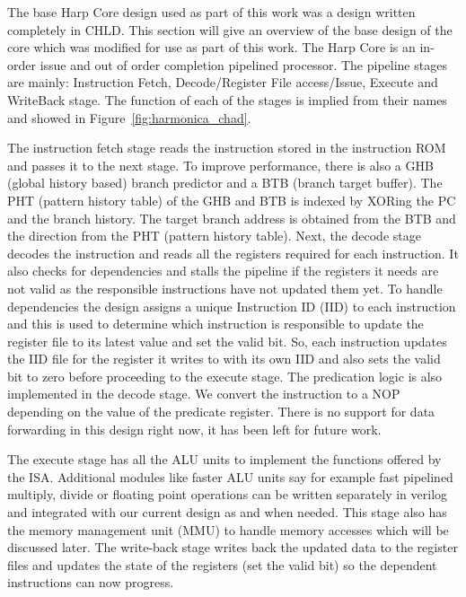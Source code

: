 The base Harp Core design used as part of this work was a design written completely in CHLD. This section will give an overview of the base design of the core which was modified for use as part of this work. The Harp Core is an in-order issue and out of order completion pipelined processor. The pipeline stages are mainly: Instruction Fetch, Decode/Register File access/Issue, Execute and WriteBack stage. The function of each of the stages is implied from their names and showed in Figure~\ref{fig:harmonica_chad}. 

The instruction fetch stage reads the instruction stored in the instruction ROM and passes it to the next stage. To improve performance, there is also a GHB (global history based) branch predictor and a BTB (branch target buffer). The PHT (pattern history table) of the GHB and BTB is indexed by XORing the PC and the branch history. The target branch address is obtained from the BTB and the direction from the PHT (pattern history table). Next, the decode stage decodes the instruction and reads all the registers required for each instruction. It also checks for dependencies and stalls the pipeline if the registers it needs are not valid as the responsible instructions have not updated them yet. To handle dependencies the design assigns a unique Instruction ID (IID) to each instruction and this is used to determine which instruction is responsible to update the register file to its latest value and set the valid bit. So, each instruction updates the IID file for the register it writes to with its own IID and also sets the valid bit to zero before proceeding to the execute stage. The predication logic is also implemented in the decode stage. We convert the instruction to a NOP depending on the value of the predicate register. There is no support for data forwarding in this design right now, it has been left for future work. 

The execute stage has all the ALU units to implement the functions offered by the ISA. Additional modules like faster ALU units say for example fast pipelined multiply, divide or floating point operations can be written separately in verilog and integrated with our current design as and when needed. This stage also has the memory management unit (MMU) to handle memory accesses which will be discussed later. %
The write-back stage writes back the updated data to the register files and updates the state of the registers (set the valid bit) so the dependent instructions can now progress.

